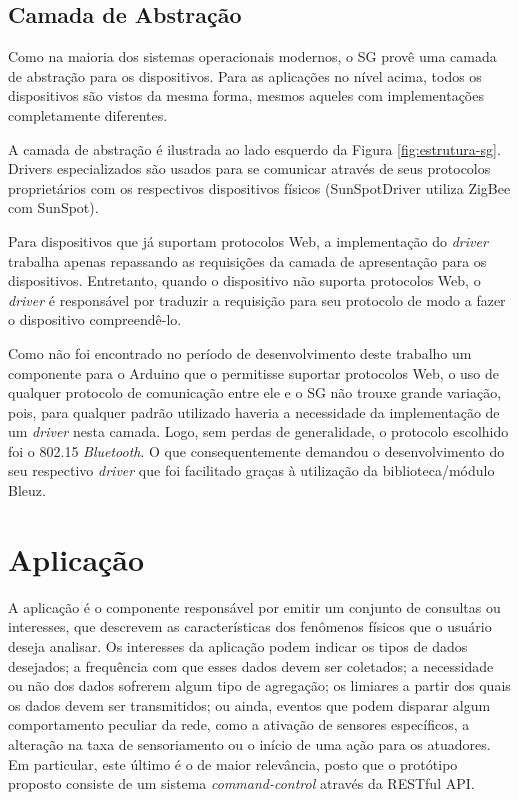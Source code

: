 \documentclass[12pt,a4paper,oneside]{report}
\begin{document}
\subsection{Camada de Abstração}

Como na maioria dos sistemas operacionais modernos, o SG provê uma camada de abstração para os dispositivos. Para as aplicações no nível acima, todos os dispositivos são vistos da mesma forma, mesmos aqueles com implementações completamente diferentes.

A camada de abstração é ilustrada ao lado esquerdo da Figura \ref{fig:estrutura-sg}. Drivers especializados são usados para se comunicar através de seus protocolos proprietários com os respectivos dispositivos físicos (SunSpotDriver utiliza ZigBee com SunSpot).

Para dispositivos que já suportam protocolos Web, a implementação do \emph{driver} trabalha apenas repassando as requisições da camada de apresentação para os dispositivos. Entretanto, quando o dispositivo não suporta protocolos Web, o \emph{driver} é responsável por traduzir a requisição para seu protocolo de modo a fazer o dispositivo compreendê-lo.

Como não foi encontrado no período de desenvolvimento deste trabalho um componente para o Arduino que o permitisse suportar protocolos Web, o uso de qualquer protocolo de comunicação entre ele e o SG não trouxe grande variação, pois, para qualquer padrão utilizado haveria a necessidade da implementação de um \emph{driver} nesta camada. Logo, sem perdas de generalidade, o protocolo escolhido foi o 802.15 \emph{Bluetooth}. O que consequentemente demandou o desenvolvimento do seu respectivo \emph{driver} que foi facilitado graças à utilização da biblioteca/módulo Bleuz.

\section{Aplicação}
\label{sec:aplicacao}

A aplicação é o componente responsável por emitir um conjunto de consultas ou interesses, que descrevem as características dos fenômenos físicos que o usuário deseja analisar. Os interesses da aplicação podem indicar os tipos de dados desejados; a frequência com que esses dados devem ser coletados; a necessidade ou não dos dados sofrerem algum tipo de agregação; os limiares a partir dos quais os dados devem ser transmitidos; ou ainda, eventos que podem disparar algum comportamento peculiar da rede, como a ativação de sensores específicos, a alteração na taxa de sensoriamento ou o início de uma ação para os atuadores. Em particular, este último é o de maior relevância, posto que o protótipo proposto consiste de um sistema  \emph{command-control} através da RESTful API.
\end{document}
